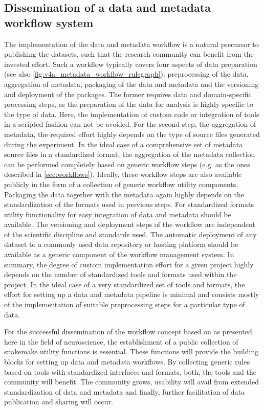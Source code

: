 \subsection{Dissemination of a data and metadata workflow system}
The implementation of the data and metadata workflow is a natural precursor to publishing the datasets, such that the research community can benefit from the invested effort. Such a workflow typically covers four aspects of data preparation (see also \cref{fig:v4a_metadata_workflow_rulegraph}): preprocessing of the data, aggregation of metadata, packaging of the data and metadata and the versioning and deployment of the packages. The former requires data and domain-specific processing steps, as the preparation of the data for analysis is highly specific to the type of data. Here, the implementation of custom code or integration of tools in a scripted fashion can not be avoided. For the second step, the aggregation of metadata, the required effort highly depends on the type of source files generated during the experiment. In the ideal case of a comprehensive set of metadata source files in a standardized format, the aggregation of the metadata collection can be performed completely based on generic workflow steps (e.g. as the ones described in \ref{sec:workflows}). Ideally, these workflow steps are also available publicly in the form of a collection of generic workflow utility components. Packaging the data together with the metadata again highly depends on the standardization of the formats used in previous steps. For standardized formats utility functionality for easy integration of data and metadata should be available. The versioning and deployment steps of the workflow are independent of the scientific discipline and standards used. The automatic deployment of any dataset to a commonly used data repository or hosting platform should be available as a generic component of the workflow management system. In summary, the degree of custom implementation effort for a given project highly depends on the number of standardized tools and formats used within the project. In the ideal case of a very standardized set of tools and formats, the effort for setting up a data and metadata pipeline is minimal and consists mostly of the implementation of suitable preprocessing steps for a particular type of data. 

For the successful dissemination of the workflow concept based on   as presented here in the field of neuroscience, the establishment of a public collection of snakemake utility functions is essential. These functions will provide the building blocks for setting up data and metadata workflows. By collecting generic rules based on tools with standardized interfaces and formats, both, the tools and the community will benefit.  The community grows, usability will avail from extended standardization of data and metadata and finally, further facilitation of data publication and sharing will occur.


